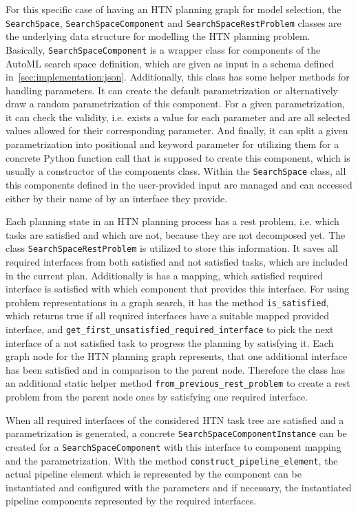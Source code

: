 For this specific case of having an HTN planning graph for model selection, the \texttt{SearchSpace}, \texttt{SearchSpaceComponent} and \texttt{SearchSpaceRestProblem} classes are the underlying data structure for modelling the HTN planning problem.\newline
Basically, \texttt{SearchSpaceComponent} is a wrapper class for components of the AutoML search space definition, which are given as input in a schema defined in~\ref{sec:implementation:json}.
Additionally, this class has some helper methods for handling parameters.
It can create the default parametrization or alternatively draw a random parametrization of this component.
For a given parametrization, it can check the validity, i.e. exists a value for each parameter and are all selected values allowed for their corresponding parameter.
And finally, it can split a given parametrization into positional and keyword parameter for utilizing them for a concrete Python function call that is supposed to create this component, which is usually a constructor of the components class.\newline
Within the \texttt{SearchSpace} class, all this components defined in the user-provided input are managed and can accessed either by their name of by an interface they provide.

Each planning state in an HTN planning process has a rest problem, i.e. which tasks are satisfied and which are not, because they are not decomposed yet.
The class \texttt{SearchSpaceRestProblem} is utilized to store this information.
It saves all required interfaces from both satisfied and not satisfied tasks, which are included in the current plan.
Additionally is has a mapping, which satisfied required interface is satisfied with which component that provides this interface.\newline
For using problem representations in a graph search, it has the method \texttt{is\_satisfied}, which returns true if all required interfaces have a suitable mapped provided interface, and \texttt{get\_first\_unsatisfied\_required\_interface} to pick the next interface of a not satisfied task to progress the planning by satisfying it.
Each graph node for the HTN planning graph represents, that one additional interface has been satisfied and in comparison to the parent node.
Therefore the class has an additional static helper method \texttt{from\_previous\_rest\_problem} to create a rest problem from the parent node ones by satisfying one required interface.

When all required interfaces of the considered HTN task tree are satisfied and a parametrization is generated, a concrete \texttt{SearchSpaceComponentInstance} can be created for a \texttt{SearchSpaceComponent} with this interface to component mapping and the parametrization.
With the method \texttt{construct\_pipeline\_element}, the actual pipeline element which is represented by the component can be instantiated and configured with the parameters and if necessary, the instantiated pipeline components represented by the required interfaces.

